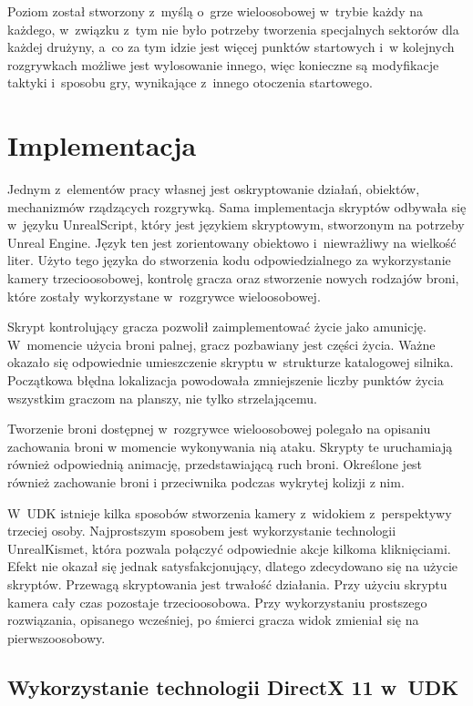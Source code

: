 Poziom został stworzony z~myślą o~grze wieloosobowej w~trybie każdy na każdego, w~związku z~tym nie było potrzeby tworzenia specjalnych sektorów dla każdej drużyny, a~co za tym idzie jest więcej punktów startowych i~w kolejnych rozgrywkach możliwe jest wylosowanie innego, więc konieczne są modyfikacje taktyki i~sposobu gry, wynikające z~innego otoczenia startowego.

\section{Implementacja}
Jednym z~elementów pracy własnej jest oskryptowanie działań, obiektów, mechanizmów rządzących rozgrywką. Sama implementacja skryptów odbywała się w~języku UnrealScript, który jest językiem skryptowym, stworzonym na potrzeby Unreal Engine. Język ten jest zorientowany obiektowo i~niewrażliwy na wielkość liter. Użyto tego języka do stworzenia kodu odpowiedzialnego za wykorzystanie kamery trzecioosobowej, kontrolę gracza oraz stworzenie nowych rodzajów broni, które zostały wykorzystane w~rozgrywce wieloosobowej.

Skrypt kontrolujący gracza pozwolił zaimplementować życie jako amunicję. W~momencie użycia broni palnej, gracz pozbawiany jest części życia. Ważne okazało się odpowiednie umieszczenie skryptu w~strukturze katalogowej silnika. Początkowa błędna lokalizacja powodowała zmniejszenie liczby punktów życia wszystkim graczom na planszy, nie tylko strzelającemu.

Tworzenie broni dostępnej w~rozgrywce wieloosobowej polegało na opisaniu zachowania broni w momencie wykonywania nią ataku. Skrypty te uruchamiają również odpowiednią animację, przedstawiającą ruch broni. Określone jest również zachowanie broni i przeciwnika podczas wykrytej kolizji z nim. 

W~UDK istnieje kilka sposobów stworzenia kamery z~widokiem z~perspektywy trzeciej osoby. Najprostszym sposobem jest wykorzystanie technologii UnrealKismet, która pozwala połączyć odpowiednie akcje kilkoma kliknięciami. Efekt nie okazał się jednak satysfakcjonujący, dlatego zdecydowano się na użycie skryptów. %
Przewagą skryptowania jest trwałość działania. Przy użyciu skryptu kamera cały czas pozostaje trzecioosobowa. Przy wykorzystaniu prostszego rozwiązania, opisanego wcześniej, po śmierci gracza widok zmieniał się na pierwszoosobowy. 

\subsection{Wykorzystanie technologii DirectX 11 w~UDK}

